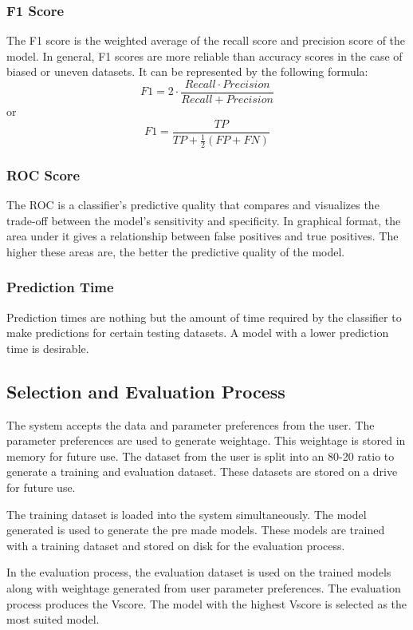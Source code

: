 \documentclass[a4paper,fleqn]{cas-dc}
\begin{document}
{\subsubsection{F1 Score}\label{subsubsec:f1_score}
The F1 score is the weighted average of the recall score and precision score of the model. In general, F1 scores are more reliable than accuracy scores in the case of biased or uneven datasets. It can be represented by the following formula:
\begin{equation*}\label{eq:f1_score}
    F1 = 2 \cdot \frac{Recall \cdot Precision}{Recall + Precision}
\end{equation*}
or
\begin{equation*}\label{eq:f1_score_2}
    F1 = \frac{TP}{TP+\frac{1}{2}(FP+FN)}
\end{equation*}

\subsubsection{ROC Score}\label{subsubsec:roc_score}
The ROC is a classifier's predictive quality that compares and visualizes the trade-off between the model's sensitivity and specificity. In graphical format, the area under it gives a relationship between false positives and true positives. The higher these areas are, the better the predictive quality of the model.

\subsubsection{Prediction Time}\label{subsubsec:prediction_time}
Prediction times are nothing but the amount of time required by the classifier to make predictions for certain testing datasets. A model with a lower prediction time is desirable.

\subsection{Selection and Evaluation Process} \label{subsec:selection_and_evaluation_process}
The system accepts the data and parameter preferences from the user. The parameter preferences are used to generate weightage. This weightage is stored in memory for future use. The dataset from the user is split into an 80-20 ratio to generate a training and evaluation dataset. These datasets are stored on a drive for future use.

The training dataset is loaded into the system simultaneously. The model generated is used to generate the pre made models. These models are trained with a training dataset and stored on disk for the evaluation process.

In the evaluation process, the evaluation dataset is used on the trained models along with weightage generated from user parameter preferences. The evaluation process produces the Vscore. The model with the highest Vscore is selected as the most suited model.
}
\end{document}
